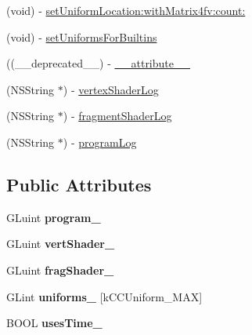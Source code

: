 \begin{DoxyCompactItemize}
\item 
(void) -\/ \hyperlink{interface_c_c_g_l_program_ae818b6b75b4682f5b6ed8c41a66e83d7}{set\-Uniform\-Location\-:with\-Matrix4fv\-:count\-:}
\item 
(void) -\/ \hyperlink{interface_c_c_g_l_program_ab7d2c467cf1e28fbb8c28d352fc1bbb7}{set\-Uniforms\-For\-Builtins}
\item 
((\-\_\-\-\_\-deprecated\-\_\-\-\_\-) -\/ \hyperlink{interface_c_c_g_l_program_a71972dcb45864fe136839f8c70ddbf29}{\-\_\-\-\_\-attribute\-\_\-\-\_\-}
\item 
(N\-S\-String $\ast$) -\/ \hyperlink{interface_c_c_g_l_program_a9425ba6c62e5b66a82c9b6259643b8a5}{vertex\-Shader\-Log}
\item 
(N\-S\-String $\ast$) -\/ \hyperlink{interface_c_c_g_l_program_a22a3e99e7645c1f523438f5a022bb2ce}{fragment\-Shader\-Log}
\item 
(N\-S\-String $\ast$) -\/ \hyperlink{interface_c_c_g_l_program_aa722d7c2b1d445224d6471c19ee3573b}{program\-Log}
\end{DoxyCompactItemize}
\subsection*{Public Attributes}
\begin{DoxyCompactItemize}
\item 
\hypertarget{interface_c_c_g_l_program_a06d7d29e3aff71a407d7f1b0a7fb885a}{G\-Luint {\bfseries program\-\_\-}}\label{interface_c_c_g_l_program_a06d7d29e3aff71a407d7f1b0a7fb885a}

\item 
\hypertarget{interface_c_c_g_l_program_a0da74d40b50b277879762d4218a7469e}{G\-Luint {\bfseries vert\-Shader\-\_\-}}\label{interface_c_c_g_l_program_a0da74d40b50b277879762d4218a7469e}

\item 
\hypertarget{interface_c_c_g_l_program_a662dd6af1ca6bc3aafda4e04ff142e6d}{G\-Luint {\bfseries frag\-Shader\-\_\-}}\label{interface_c_c_g_l_program_a662dd6af1ca6bc3aafda4e04ff142e6d}

\item 
\hypertarget{interface_c_c_g_l_program_a669a319b6978d213a81f4e47140801a9}{G\-Lint {\bfseries uniforms\-\_\-} \mbox{[}k\-C\-C\-Uniform\-\_\-\-M\-A\-X\mbox{]}}\label{interface_c_c_g_l_program_a669a319b6978d213a81f4e47140801a9}

\item 
\hypertarget{interface_c_c_g_l_program_ac025933cc3fb7aea91dbf441cf32a90f}{B\-O\-O\-L {\bfseries uses\-Time\-\_\-}}\label{interface_c_c_g_l_program_ac025933cc3fb7aea91dbf441cf32a90f}

\end{DoxyCompactItemize}
